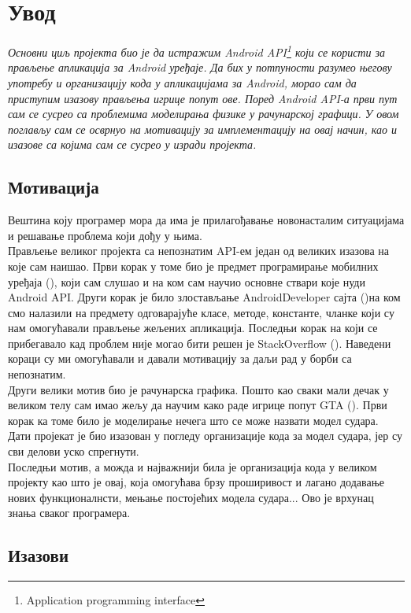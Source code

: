 
\chapter{Увод}
\emph{Основни циљ пројекта био је да истражим Android API\footnote{Application programming interface} који се користи за прављење апликација за Android уређаје. Да бих у потпуности разумео његову употребу и организацију кода у апликацијама за Android, морао сам да приступим изазову прављења игрице попут ове. Поред Android API-а први пут сам се сусрео са проблемима моделирања физике у рачунарској графици. У овом поглављу сам се осврнуо на мотивацију за имплементацију на овај начин, као и изазове са којима сам се сусрео у изради пројекта. }
\section{Мотивација}
Вештина коју програмер мора да има је прилагођавање новонасталим ситуацијама и решавање проблема који дођу у њима. 
\\ \indent Прављење великог пројекта са  непознатим API-ем један од великих изазова на које сам наишао. Први корак у томе био је предмет програмирање мобилних уређаја (\cite{PMU}), који сам слушао и на ком сам научио основне ствари које нуди Android API. Други корак је било злостављање AndroidDeveloper сајта (\cite{AndroidDeveloper})на ком смо налазили на предмету одговарајуће класе, методе, константе, чланке који су нам омогућавали прављење жељених апликација. Последњи корак на који се прибегавало кад проблем није могао бити решен је StackOverflow (\cite{StackOverflow}). Наведени кораци су ми омогућавали и давали мотивацију за даљи рад у борби са непознатим.
\\ \indent Други велики мотив био је рачунарска графика. Пошто као сваки мали дечак у великом телу сам имао жељу да научим како раде игрице попут GTA (\cite{GTA}). Први корак ка томе било је моделирање нечега што се може назвати модел судара. Дати пројекат је био изазован у погледу организације кода за модел судара, јер су сви делови уско спрегнути.
\\ \indent Последњи мотив, а можда и најважнији била је организација кода у великом пројекту као што је овај, која омогућава брзу проширивост и лагано додавање нових функционалнсти, мењање постојећих модела судара... Ово је врхунац знања сваког програмера.

\section{Изазови}

	